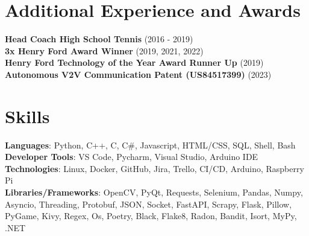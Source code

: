 \documentclass[letterpaper,11pt]{article}
\begin{document}
\section{Additional Experience and Awards}
 \begin{itemize}[leftmargin=0.15in, label={}]
    \small{\item{
     \textbf{Head Coach High School Tennis} {(2016 - 2019)} \\
     \textbf{3x Henry Ford Award Winner} {(2019, 2021, 2022)} \\
     \textbf{Henry Ford Technology of the Year Award Runner Up} {(2019)} \\
     \textbf{Autonomous V2V Communication Patent (US84517399)} {(2023)} \\
    }}
 \end{itemize}

%
\section{Skills}
 \begin{itemize}[leftmargin=0.15in, label={}]
    \small{\item{
     \textbf{Languages}{: Python, C++, C, C\#, Javascript, HTML/CSS, SQL, Shell, Bash} \\
     \textbf{Developer Tools}{: VS Code, Pycharm, Visual Studio, Arduino IDE} \\
     \textbf{Technologies}{: Linux, Docker, GitHub, Jira, Trello, CI/CD, Arduino, Raspberry Pi} \\
      \textbf{Libraries/Frameworks}{: OpenCV, PyQt, Requests, Selenium, Pandas, Numpy, Asyncio, Threading, Protobuf, JSON, Socket, FastAPI, Scrapy, Flask, Pillow, PyGame, Kivy, Regex, Os, Poetry, Black, Flake8, Radon, Bandit, Isort, MyPy, .NET } \\
    }}
 \end{itemize}
 \vspace{-16pt}
\end{document}
